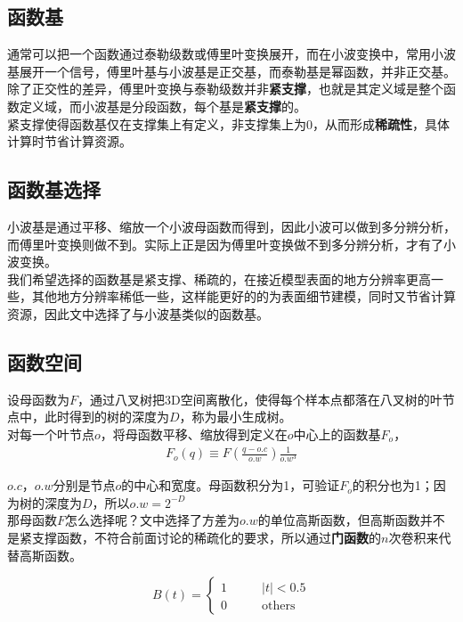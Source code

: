 	\subsection{函数基}
		通常可以把一个函数通过泰勒级数或傅里叶变换展开，而在小波变换中，常用小波基展开一个信号，傅里叶基与小波基是正交基，而泰勒基是幂函数，并非正交基。\\

		除了正交性的差异，傅里叶变换与泰勒级数并非\textbf{紧支撑}，也就是其定义域是整个函数定义域，而小波基是分段函数，每个基是\textbf{紧支撑}的。\\

		紧支撑使得函数基仅在支撑集上有定义，非支撑集上为0，从而形成\textbf{稀疏性}，具体计算时节省计算资源。

	\subsection{函数基选择}
		小波基是通过平移、缩放一个小波母函数而得到，因此小波可以做到多分辨分析，而傅里叶变换则做不到。实际上正是因为傅里叶变换做不到多分辨分析，才有了小波变换。\\

		我们希望选择的函数基是紧支撑、稀疏的，在接近模型表面的地方分辨率更高一些，其他地方分辨率稀低一些，这样能更好的的为表面细节建模，同时又节省计算资源，因此文中选择了与小波基类似的函数基。

	\subsection{函数空间}
		设母函数为$F$，通过八叉树把3D空间离散化，使得每个样本点都落在八叉树的叶节点中，此时得到的树的深度为$D$，称为最小生成树。\\

		对每一个叶节点$o$，将母函数平移、缩放得到定义在$o$中心上的函数基$F_o$，
		\begin{align}
			F_o(q) \equiv F\left(\frac{q-o.c}{o.w}\right)\frac{1}{o.w^3} \label{wavelet_func}
		\end{align}

		$o.c$，$o.w$分别是节点$o$的中心和宽度。母函数积分为1，可验证$F_o$的积分也为1；因为树的深度为$D$，所以$o.w = 2^{-D}$\\

		那母函数$F$怎么选择呢？文中选择了方差为$o.w$的单位高斯函数，但高斯函数并不是紧支撑函数，不符合前面讨论的稀疏化的要求，所以通过\textbf{门函数}的$n$次卷积来代替高斯函数。

			$$
				B(t) = \left\lbrace 
					\begin{aligned}
						1 \qquad &|t| < 0.5 \\
						0 \qquad &\text{others}
					\end{aligned}
				\right.
			$$

